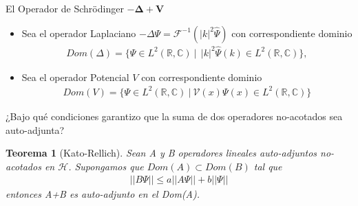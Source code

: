 \documentclass[aspectratio=1610]{beamer}
\newcommand*{\field}[1]{\mathbb{#1}}
\newtheorem*{teo}{Teorema}
\begin{document}
\begin{frame}{El Operador de Schrödinger $\boldsymbol{-\Delta + V}$}

\begin{itemize}
    \item Sea el operador Laplaciano $-\Delta\Psi = \mathcal{F}^{-1}(|k|^{2} \hat{\Psi})$ con correspondiente dominio 
    \begin{align*} Dom(\Delta) = \{\Psi\in L^{2}(\field{R},\field{C}) \:|\:
       \: |k|^{2}\hat{\Psi}(k) \in L^{2}(\field{R},\field{C})\},
    \end{align*}
    \item Sea el operador Potencial $V$ con correspondiente dominio
    \begin{align*}  Dom(V) = \{
        \Psi\in L^{2}(\field{R},\field{C})\:|\:\mathcal{V}(x)\Psi(x)\in L^{2}(\field{R},\field{C})
        \}
    \end{align*}
    
\end{itemize}
    
\end{frame}

\begin{frame}{¿Bajo qué condiciones garantizo que la suma de dos operadores no-acotados sea auto-adjunta?}

\vspace{0.03\textheight} 

\begin{teo}[Kato-Rellich]
    Sean  A y B operadores lineales auto-adjuntos no-acotados en $\mathcal{H}$. Supongamos que $Dom(A)\subset Dom(B)$ tal que
    \begin{align*}
        ||B\Psi|| \leq a||A\Psi|| + b||\Psi||
    \end{align*}
    entonces A+B es auto-adjunto en el Dom(A).
    \label{teo:K-R}
\end{teo}    
\end{frame}
\end{document}
